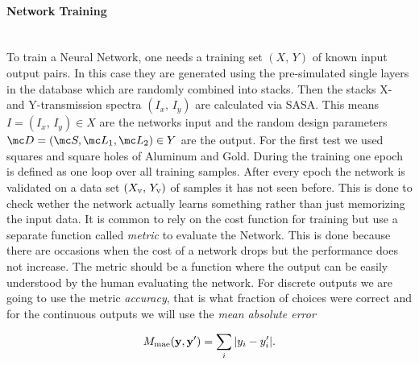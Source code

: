 \paragraph{Network Training}~\\
To train a Neural Network, one needs a training set $(X, \, Y)$ of known input output pairs. In this case they are generated using the pre-simulated single layers in the database which are randomly combined into stacks. Then the stacks X- and Y-transmission spectra $(I_x, \, I_y)$ are calculated via SASA.
This means $I = (I_x, \, I_y) \in X$ are the networks input and the random design parameters ${\mc D = (\mc S, \mc L_1, \mc L_2) \in Y}$ are the output. For the first test we used squares and square holes of Aluminum and Gold. During the training one epoch is defined as one loop over all training samples. After every epoch the network is validated on a data set $(X_{\mathrm{v}}, \, Y_{\mathrm{v}})$ of samples it has not seen before. This is done to check wether the network actually learns something rather than just memorizing the input data. It is common to rely on the cost function for training but use a separate function called \textit{metric} to evaluate the Network. This is done because there are occasions when the cost of a network drops but the performance does not increase. The metric should be a function where the output can be easily understood by the human evaluating the network. For discrete outputs we are going to use the metric \textit{accuracy}, that is what fraction of choices were correct and for the continuous outputs we will use the \textit{mean absolute error}

\begin{equation} \label{eq:al:mae}
    M_{\mathrm{mae}}(\vb y, \vb y') = \sum_i \qty|y_i - y'_i|.
\end{equation}

